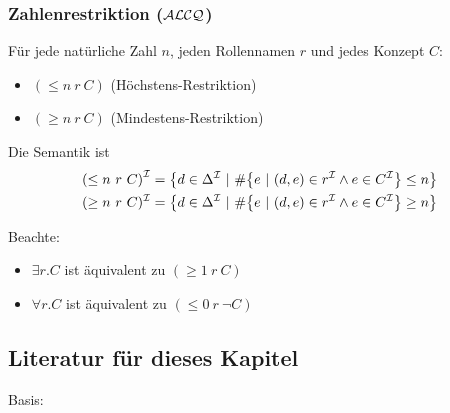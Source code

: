 \subsubsection{Zahlenrestriktion (\texorpdfstring{$\mathcal{A}\mathcal{L}\mathcal{C}\mathcal{Q}$}{ALCQ})}\label{zahlenrestriktion-alcq}

\begin{definition}[Zahlenrestriktion]
Für jede natürliche Zahl $n$, jeden Rollennamen $r$ und
jedes Konzept $C$:

\begin{itemize}
  \item $\left( \leq n\ r\ C \right)$ (Höchstens-Restriktion)
  \item $\left( \geq n\ r\ C \right)$ (Mindestens-Restriktion)
\end{itemize}

Die Semantik ist \begin{align*}
    \left( \leq n\ r\ C \right)^\MI &= \left\{ d \in \Delta^\MI\ |\ \#\left\{ e\ |\ \left( d,e \right) \in r^\MI \land e \in C^\MI \right\} \leq n \right\}\\
    ( \geq n\ r\ C)^\MI &= \left\{ d \in \Delta^\MI\ |\ \#\left\{ e\ |\ \left( d,e \right) \in r^\MI \land e \in C^\MI \right\} \geq n \right\}
\end{align*}
\end{definition}

\begin{tafel}[TODO]
\end{tafel}

Beachte:

\begin{itemize}
  \item $\exists r.C$ ist äquivalent zu $(\geq 1\ r\ C)$
  \item $\forall r.C$ ist äquivalent zu $(\leq 0\ r\ \neg C)$
\end{itemize}

\subsection*{Literatur für dieses Kapitel}

Basis:

